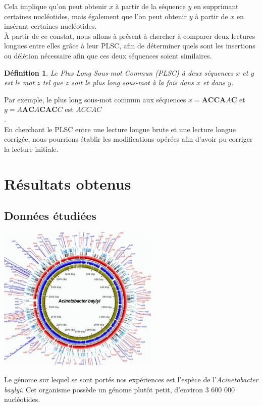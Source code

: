 \documentclass{report}
\newtheorem{defgt}{Définition}
\begin{document}
      Cela implique qu'on peut obtenir $x$ à partir de la séquence $y$ en supprimant certaines nucléotides, mais également que l'on peut obtenir $y$ à partir de $x$ en insérant certaines nucléotides.\\

      À partir de ce constat, nous allons à présent à chercher à comparer deux lectures longues entre elles grâce à leur PLSC, afin de déterminer quels sont les insertions ou délétion nécessaire afin que ces deux séquences soient similaires.
      \begin{defgt}
        Le Plus Long Sous-mot Commun (PLSC) à deux séquences $x$ et $y$ est le mot $z$ tel que $z$ soit le plus long sous-mot à la fois dans $x$ et dans $y$.
      \end{defgt}
      Par exemple, le plus long sous-mot commun aux séquences $x = \mathbf{ACCA}A\mathbf{C}$ et $y = A\mathbf{AC}A\mathbf{CAC}C$ est $ACCAC$\\.\\

      En cherchant le PLSC entre une lecture longue brute et une lecture longue corrigée, nous pourrions établir les modifications opérées afin d'avoir pu corriger la lecture initiale.
    \newpage
  \chapter{Résultats obtenus}
    \section{Données étudiées}
      \begin{center}
        \includegraphics[height=70mm]{acineto}
      \end{center}
      Le génome sur lequel se sont portés nos expériences est l'espèce de l'\textit{Acinetobacter baylyi}. Cet organisme possède un génome plutôt petit, d'environ 3 600 000 nucléotides.\\
\end{document}
